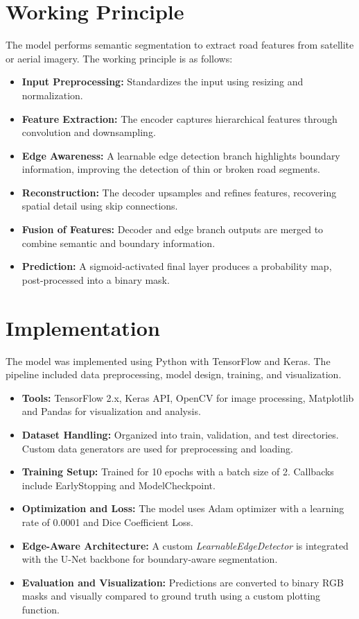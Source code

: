 \documentclass[conference]{IEEEtran}
\begin{document}
\section{Working Principle}

The model performs semantic segmentation to extract road features from satellite or aerial imagery. The working principle is as follows:

\begin{itemize}
    \item \textbf{Input Preprocessing:} Standardizes the input using resizing and normalization.
    \item \textbf{Feature Extraction:} The encoder captures hierarchical features through convolution and downsampling.
    \item \textbf{Edge Awareness:} A learnable edge detection branch highlights boundary information, improving the detection of thin or broken road segments.
    \item \textbf{Reconstruction:} The decoder upsamples and refines features, recovering spatial detail using skip connections.
    \item \textbf{Fusion of Features:} Decoder and edge branch outputs are merged to combine semantic and boundary information.
    \item \textbf{Prediction:} A sigmoid-activated final layer produces a probability map, post-processed into a binary mask.
\end{itemize}

\section{Implementation}

The model was implemented using Python with TensorFlow and Keras. The pipeline included data preprocessing, model design, training, and visualization.

\begin{itemize}
    \item \textbf{Tools:} TensorFlow 2.x, Keras API, OpenCV for image processing, Matplotlib and Pandas for visualization and analysis.
    \item \textbf{Dataset Handling:} Organized into train, validation, and test directories. Custom data generators are used for preprocessing and loading.
    \item \textbf{Training Setup:} Trained for 10 epochs with a batch size of 2. Callbacks include EarlyStopping and ModelCheckpoint.
    \item \textbf{Optimization and Loss:} The model uses Adam optimizer with a learning rate of 0.0001 and Dice Coefficient Loss.
    \item \textbf{Edge-Aware Architecture:} A custom \textit{LearnableEdgeDetector} is integrated with the U-Net backbone for boundary-aware segmentation.
    \item \textbf{Evaluation and Visualization:} Predictions are converted to binary RGB masks and visually compared to ground truth using a custom plotting function.
\end{itemize}
\end{document}
